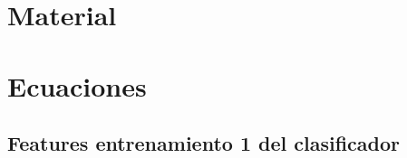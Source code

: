 \documentclass[spanish, a4paper, 12pt, twoside, openany,final]{book}
\numberwithin{equation}{section}
\begin{document}
\newpage
\renewcommand{\appendixpagename}{Apéndices}     %

\appendix   %

\chapter{Material}

\chapter{Ecuaciones}
\section*{Features entrenamiento 1 del clasificador}
\end{document}
